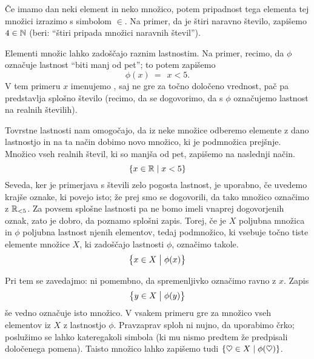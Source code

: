 
Če imamo dan neki element in neko množico, potem pripadnost tega elementa tej množici izrazimo s simbolom $\in$. Na primer, da je štiri naravno število, zapišemo $4 \in \mathbb{N}$ (beri: ``štiri pripada množici naravnih števil'').

Elementi množic lahko zadoščajo raznim lastnostim. Na primer, recimo, da $\phi$ označuje lastnost ``biti manj od pet''; to potem zapišemo
\[\phi(x) \ = \ \ x < 5.\]
V tem primeru $x$ imenujemo , saj ne gre za točno določeno vrednost, pač pa predstavlja splošno število (recimo, da se dogovorimo, da s $\phi$ označujemo lastnost na realnih številih).

Tovrstne lastnosti nam omogočajo, da iz neke množice odberemo elemente z dano lastnostjo in na ta način dobimo novo množico, ki je podmnožica prejšnje. Množico vseh realnih števil, ki so manjša od pet, zapišemo na naslednji način.
\[\set{x \in \RR}{x < 5}\]
Seveda, ker je primerjava s števili zelo pogosta lastnost, je uporabno, če uvedemo krajše oznake, ki povejo isto; že prej smo se dogovorili, da tako množico označimo z $\mathbb{R}_{< 5}$. Za povsem splošne lastnosti pa ne bomo imeli vnaprej dogovorjenih oznak, zato je dobro, da poznamo splošni zapis. Torej, če je $X$ poljubna množica in $\phi$ poljubna lastnost njenih elementov, tedaj podmnožico, ki vsebuje točno tiste elemente množice $X$, ki zadoščajo lastnosti $\phi$, označimo takole.
\[\set[1]{x \in X}{\phi(x)}\]

Pri tem se zavedajmo: ni pomembno, da spremenljivko označimo ravno z $x$. Zapis
\[\set[1]{y \in X}{\phi(y)}\]
še vedno označuje isto množico. V vsakem primeru gre za množico vseh elementov iz $X$ z lastnostjo $\phi$. Pravzaprav sploh ni nujno, da uporabimo črko; poslužimo se lahko kateregakoli simbola (ki mu nismo predtem že predpisali določenega pomena). Taisto množico lahko zapišemo tudi $\set{\heartsuit \in X}{\phi(\heartsuit)}$.


